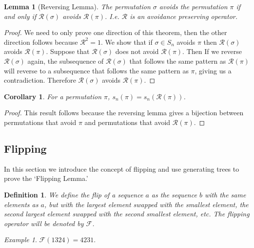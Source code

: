 \documentclass[11pt,letterpaper,twoside,english]{article}
\theoremstyle{theorem}
\newtheorem{corollary}[theorem]{Corollary}
\newtheorem{lemma}[theorem]{Lemma}
\newtheorem{definition}[theorem]{Definition}
\theoremstyle{remark}
\newtheorem{example}[theorem]{Example}
\begin{document}
\begin{lemma}[Reversing Lemma]
The permutation $\sigma$ avoids the permutation $\pi$ if and only if $\mathcal{R}(\sigma)$ avoids $\mathcal{R}(\pi)$. I.e. $\mathcal{R}$ is an avoidance preserving operator. 
\end{lemma}
\begin{proof}
We need to only prove one direction of this theorem, then the other direction follows because $\mathcal{R}^2=1$. We show that if ${\sigma}\in S_n$ avoids $\pi$ then $\mathcal{R}(\sigma)$ avoids $\mathcal{R}(\pi)$. Suppose that $\mathcal{R}(\sigma)$ does not avoid $\mathcal{R}(\pi)$. Then If we reverse $\mathcal{R}(\sigma)$ again, the subsequence of $\mathcal{R}(\sigma)$ that follows the same pattern as $\mathcal{R}(\pi)$ will reverse to a subsequence that follows the same pattern as $\pi$, giving us a contradiction. Therefore $\mathcal{R}(\sigma)$ avoids $\mathcal{R}(\pi)$. 

\end{proof}

\begin{corollary} 
For a permutation $\pi$, $s_n(\pi)=s_n(\mathcal{R}(\pi))$. 
\end{corollary}
\begin{proof}
This result follows because the reversing lemma gives a bijection between permutations that avoid $\pi$ and permutations that avoid $\mathcal{R}(\pi)$. 
\end{proof}

\subsection{Flipping}
In this section we introduce the concept of flipping and use generating trees to prove the `Flipping Lemma.'
\begin{definition}
We define the \emph{flip} of a sequence $a$ as the sequence $b$ with the same elements as $a$, but with the largest element swapped with the smallest element, the second largest element swapped with the second smallest element, etc.  The flipping operator will be denoted by $\mathcal{F}$.  
\end{definition}

\begin{example}
$\mathcal{F}(1324)=4231$.
\end{example}
\end{document}
